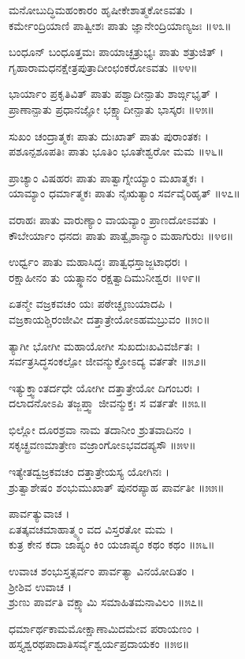 ಮನೋಬುದ್ಧಿಮಹಂಕಾರಂ ಹೃಷೀಕೇಶಾತ್ಮಕೋಽವತು ।\\
ಕರ್ಮೇಂದ್ರಿಯಾಣಿ ಪಾತ್ವೀಶಃ ಪಾತು ಜ್ಞಾನೇಂದ್ರಿಯಾಣ್ಯಜಃ ॥೪೩॥

ಬಂಧೂನ್ ಬಂಧೂತ್ತಮಃ ಪಾಯಾಚ್ಛತ್ರುಭ್ಯಃ ಪಾತು ಶತ್ರುಜಿತ್ ।\\
ಗೃಹಾರಾಮಧನಕ್ಷೇತ್ರಪುತ್ರಾದೀಂಛಂಕರೋಽವತು ॥೪೪॥

ಭಾರ್ಯಾಂ ಪ್ರಕೃತಿವಿತ್ ಪಾತು ಪಶ್ವಾದೀನ್ಪಾತು ಶಾರ್ಙ್ಗಭೃತ್ ।\\
ಪ್ರಾಣಾನ್ಪಾತು ಪ್ರಧಾನಜ್ಞೋ ಭಕ್ಷ್ಯಾದೀನ್ಪಾತು ಭಾಸ್ಕರಃ ॥೪೫॥

ಸುಖಂ ಚಂದ್ರಾತ್ಮಕಃ ಪಾತು ದುಃಖಾತ್ ಪಾತು ಪುರಾಂತಕಃ ।\\
ಪಶೂನ್ಪಶೂಪತಿಃ ಪಾತು ಭೂತಿಂ ಭೂತೇಶ್ವರೋ ಮಮ ॥೪೬॥

ಪ್ರಾಚ್ಯಾಂ ವಿಷಹರಃ ಪಾತು ಪಾತ್ವಾಗ್ನೇಯ್ಯಾಂ ಮಖಾತ್ಮಕಃ ।\\
ಯಾಮ್ಯಾಂ ಧರ್ಮಾತ್ಮಕಃ ಪಾತು ನೈಋತ್ಯಾಂ ಸರ್ವವೈರಿಹೃತ್ ॥೪೭॥

ವರಾಹಃ ಪಾತು ವಾರುಣ್ಯಾಂ ವಾಯವ್ಯಾಂ ಪ್ರಾಣದೋಽವತು ।\\
ಕೌಬೇರ್ಯಾಂ ಧನದಃ ಪಾತು ಪಾತ್ವೈಶಾನ್ಯಾಂ ಮಹಾಗುರುಃ ॥೪೮॥

ಉರ್ಧ್ವಂ ಪಾತು ಮಹಾಸಿದ್ಧಃ ಪಾತ್ವಧಸ್ತಾಜ್ಜಟಾಧರಃ ।\\
ರಕ್ಷಾಹೀನಂ ತು ಯತ್ಸ್ಥಾನಂ ರಕ್ಷತ್ವಾದಿಮುನೀಶ್ವರಃ ॥೪೯॥

ಏತನ್ಮೇ ವಜ್ರಕವಚಂ ಯಃ ಪಠೇಚ್ಛೃಣುಯಾದಪಿ ।\\
ವಜ್ರಕಾಯಶ್ಚಿರಂಜೀವೀ ದತ್ತಾತ್ರೇಯೋಽಹಮಬ್ರುವಂ ॥೫೦॥

ತ್ಯಾಗೀ ಭೋಗೀ ಮಹಾಯೋಗೀ ಸುಖದುಃಖವಿವರ್ಜಿತಃ ।\\
ಸರ್ವತ್ರಸಿದ್ಧಸಂಕಲ್ಪೋ ಜೀವನ್ಮುಕ್ತೋಽದ್ಯ ವರ್ತತೇ ॥೫೨॥

ಇತ್ಯುಕ್ತ್ವಾಂತರ್ದಧೇ ಯೋಗೀ ದತ್ತಾತ್ರೇಯೋ ದಿಗಂಬರಃ ।\\
ದಲಾದನೋಽಪಿ ತಜ್ಜಪ್ತ್ವಾ ಜೀವನ್ಮುಕ್ತಃ ಸ ವರ್ತತೇ ॥೫೩॥

ಭಿಲ್ಲೋ ದೂರಶ್ರವಾ ನಾಮ ತದಾನೀಂ ಶ್ರುತವಾದಿನಂ ।\\
ಸಕೃಚ್ಛ್ರವಣಮಾತ್ರೇಣ ವಜ್ರಾಂಗೋಽಭವದಪ್ಯಸೌ ॥೫೪॥

ಇತ್ಯೇತದ್ವಜ್ರಕವಚಂ ದತ್ತಾತ್ರೇಯಸ್ಯ ಯೋಗಿನಃ ।\\
ಶ್ರುತ್ವಾಶೇಷಂ ಶಂಭುಮುಖಾತ್ ಪುನರಪ್ಯಾಹ ಪಾರ್ವತೀ ॥೫೫॥

ಪಾರ್ವತ್ಯುವಾಚ ।\\
ಏತತ್ಕವಚಮಾಹಾತ್ಮ್ಯಂ ವದ ವಿಸ್ತರತೋ ಮಮ ।\\
ಕುತ್ರ ಕೇನ ಕದಾ ಜಾಪ್ಯಂ ಕಿಂ ಯಜಾಪ್ಯಂ ಕಥಂ ಕಥಂ ॥೫೬॥

ಉವಾಚ ಶಂಭುಸ್ತತ್ಸರ್ವಂ ಪಾರ್ವತ್ಯಾ ವಿನಯೋದಿತಂ ।\\
ಶ್ರೀಶಿವ ಉವಾಚ ।\\
ಶ್ರುಣು ಪಾರ್ವತಿ ವಕ್ಷ್ಯಾಮಿ ಸಮಾಹಿತಮನಾವಿಲಂ ॥೫೭॥

ಧರ್ಮಾರ್ಥಕಾಮಮೋಕ್ಷಾಣಾಮಿದಮೇವ ಪರಾಯಣಂ ।\\
ಹಸ್ತ್ಯಶ್ವರಥಪಾದಾತಿಸರ್ವೈಶ್ವರ್ಯಪ್ರದಾಯಕಂ ॥೫೮॥

